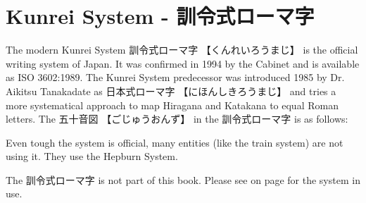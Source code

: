 \section{Kunrei System - 訓令式ローマ字} \label{sec:Kunrei}

The modern Kunrei System {訓令式ローマ字} {【くんれいろうまじ】}  is the
official writing system of Japan. It was confirmed in 1994 by the Cabinet and
is available as ISO 3602:1989. The Kunrei System predecessor was introduced
1985 by Dr. Aikitsu Tanakadate as {日本式ローマ字} {【にほんしきろうまじ】} and
tries a more systematical approach to map Hiragana and Katakana to equal Roman
letters. The {五十音図} {【ごじゅうおんず】} in the {訓令式ローマ字} is as
follows:


Even tough the system is official, many entities (like the train system) are
not using it. They use the Hepburn System.

The {訓令式ローマ字} is not part of this book. Please see 
on page \pageref{sec:Hepburn} for the system in use.
